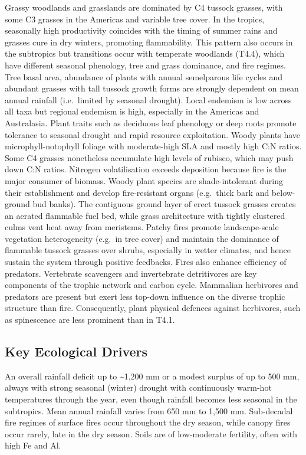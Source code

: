 \documentclass[
  letterpaper,
  DIV=11,
  numbers=noendperiod]{scrartcl}
\begin{document}
Grassy woodlands and grasslands are dominated by C4 tussock grasses,
with some C3 grasses in the Americas and variable tree cover. In the
tropics, seasonally high productivity coincides with the timing of
summer rains and grasses cure in dry winters, promoting flammability.
This pattern also occurs in the subtropics but transitions occur with
temperate woodlands (T4.4), which have different seasonal phenology,
tree and grass dominance, and fire regimes. Tree basal area, abundance
of plants with annual semelparous life cycles and abundant grasses with
tall tussock growth forms are strongly dependent on mean annual rainfall
(i.e.~limited by seasonal drought). Local endemism is low across all
taxa but regional endemism is high, especially in the Americas and
Australasia. Plant traits such as deciduous leaf phenology or deep roots
promote tolerance to seasonal drought and rapid resource exploitation.
Woody plants have microphyll-notophyll foliage with moderate-high SLA
and mostly high C:N ratios. Some C4 grasses nonetheless accumulate high
levels of rubisco, which may push down C:N ratios. Nitrogen
volatilisation exceeds deposition because fire is the major consumer of
biomass. Woody plant species are shade-intolerant during their
establishment and develop fire-resistant organs (e.g.~thick bark and
below-ground bud banks). The contiguous ground layer of erect tussock
grasses creates an aerated flammable fuel bed, while grass architecture
with tightly clustered culms vent heat away from meristems. Patchy fires
promote landscape-scale vegetation heterogeneity (e.g.~in tree cover)
and maintain the dominance of flammable tussock grasses over shrubs,
especially in wetter climates, and hence sustain the system through
positive feedbacks. Fires also enhance efficiency of predators.
Vertebrate scavengers and invertebrate detritivores are key components
of the trophic network and carbon cycle. Mammalian herbivores and
predators are present but exert less top-down influence on the diverse
trophic structure than fire. Consequently, plant physical defences
against herbivores, such as spinescence are less prominent than in T4.1.

\subsection{Key Ecological Drivers}\label{key-ecological-drivers-84}

An overall rainfall deficit up to \textasciitilde1,200 mm or a modest
surplus of up to 500 mm, always with strong seasonal (winter) drought
with continuously warm-hot temperatures through the year, even though
rainfall becomes less seasonal in the subtropics. Mean annual rainfall
varies from 650 mm to 1,500 mm. Sub-decadal fire regimes of surface
fires occur throughout the dry season, while canopy fires occur rarely,
late in the dry season. Soils are of low-moderate fertility, often with
high Fe and Al.
\end{document}
